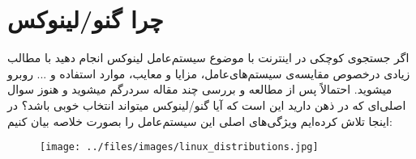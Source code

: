 \section{چرا گنو/لینوکس}
اگر جستجوی کوچکی در اینترنت با موضوع سیستم‌عامل لینوکس انجام دهید با مطالب زیادی درخصوص مقایسه‌ی سیستم‌های‌عامل، مزایا و معایب، موارد استفاده و ... روبرو میشوید. احتمالاً پس از مطالعه و بررسی چند مقاله سردرگم میشوید و هنوز سوال اصلی‌ای که در ذهن دارید این است که آیا گنو/لینوکس میتواند انتخاب خوبی باشد؟ در اینجا تلاش کرده‌ایم ویژگی‌های اصلی این سیستم‌عامل را بصورت خلاصه بیان کنیم:
\begin{figure}[H]
	\begin{center}
		\texttt{[image: ../files/images/linux\_distributions.jpg]}
	\end{center}
\end{figure}

